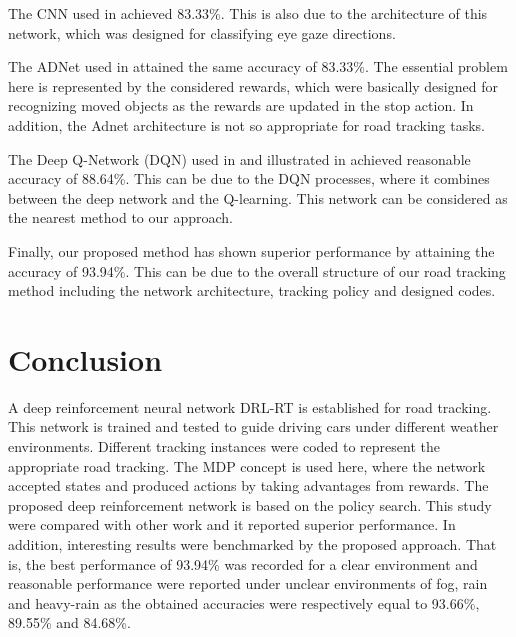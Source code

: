 \documentclass{svproc}
\begin{document}
The CNN used in \cite{George2016Real} achieved 83.33\%. This is also due to the architecture of this network, which was designed for classifying eye gaze directions. 

The ADNet used in \cite{Yun2017Action,Yun2018Action} attained the same accuracy of 83.33\%. The essential problem here is represented by the considered rewards, which were basically designed %
for recognizing moved objects as the rewards are updated in the stop action. In addition, the Adnet architecture is not so appropriate for road tracking tasks. 


The Deep Q-Network (DQN) used in \cite{mnih2015human} and illustrated in \cite{arulkumaran2017brief} achieved reasonable accuracy of 88.64\%. This can be due to the DQN processes, where it combines between the deep network and the Q-learning. This network can be considered as the nearest method to our approach. 

Finally, our proposed method has shown superior performance by attaining the accuracy of 93.94\%. This can be due to the overall structure of our road tracking method including the network architecture, tracking policy and designed codes.

\section{Conclusion}
A deep reinforcement neural network DRL-RT is established for road tracking. This network is trained and tested to guide driving cars under different weather environments. Different tracking instances were coded to represent the appropriate road tracking. The MDP concept is used here, where the network accepted states and produced actions by taking advantages from rewards. The proposed deep reinforcement network is based on the policy search. This study were compared with other work and it reported superior performance. In addition, interesting results were benchmarked by the proposed approach. That is, the best performance of 93.94\% was recorded for a clear environment and reasonable performance were reported under unclear environments of fog, rain and heavy-rain as the obtained accuracies were respectively equal to 93.66\%, 89.55\% and 84.68\%. 
%
%
%
%

 
\end{document}
